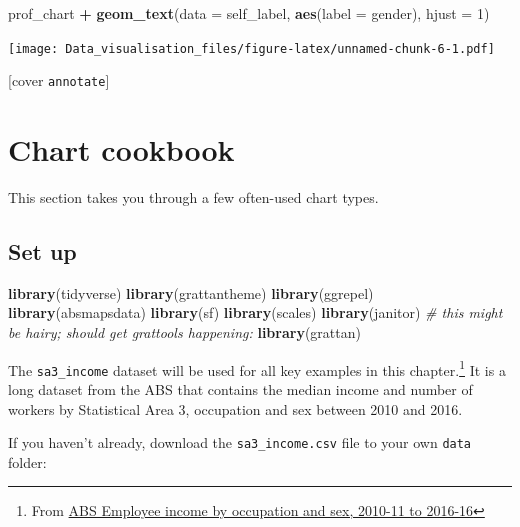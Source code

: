 \documentclass[
]{book}
\newenvironment{Shaded}{\begin{snugshade}}{\end{snugshade}}
\newcommand{\CommentTok}[1]{\textcolor[rgb]{0.56,0.35,0.01}{\textit{#1}}}
\newcommand{\DataTypeTok}[1]{\textcolor[rgb]{0.13,0.29,0.53}{#1}}
\newcommand{\DecValTok}[1]{\textcolor[rgb]{0.00,0.00,0.81}{#1}}
\newcommand{\KeywordTok}[1]{\textcolor[rgb]{0.13,0.29,0.53}{\textbf{#1}}}
\newcommand{\NormalTok}[1]{#1}
\newcommand{\OperatorTok}[1]{\textcolor[rgb]{0.81,0.36,0.00}{\textbf{#1}}}
\newcommand{\StringTok}[1]{\textcolor[rgb]{0.31,0.60,0.02}{#1}}
\begin{document}
\begin{Shaded}
\begin{Highlighting}[]
\NormalTok{prof\_chart }\OperatorTok{+}
\StringTok{  }\KeywordTok{geom\_text}\NormalTok{(}\DataTypeTok{data =}\NormalTok{ self\_label,}
            \KeywordTok{aes}\NormalTok{(}\DataTypeTok{label =}\NormalTok{ gender), }
            \DataTypeTok{hjust =} \DecValTok{1}\NormalTok{)}
\end{Highlighting}
\end{Shaded}

\texttt{[image: Data\_visualisation\_files/figure-latex/unnamed-chunk-6-1.pdf]}

{[}cover \texttt{annotate}{]}

\hypertarget{chart-cookbook}{%
\chapter{Chart cookbook}\label{chart-cookbook}}

This section takes you through a few often-used chart types.

\hypertarget{set-up-1}{%
\section{Set up}\label{set-up-1}}

\begin{Shaded}
\begin{Highlighting}[]
\KeywordTok{library}\NormalTok{(tidyverse)}
\KeywordTok{library}\NormalTok{(grattantheme)}
\KeywordTok{library}\NormalTok{(ggrepel)}
\KeywordTok{library}\NormalTok{(absmapsdata)}
\KeywordTok{library}\NormalTok{(sf)}
\KeywordTok{library}\NormalTok{(scales)}
\KeywordTok{library}\NormalTok{(janitor)}
\CommentTok{\# this might be hairy; should get \textasciigrave{}grattools\textasciigrave{} happening:}
\KeywordTok{library}\NormalTok{(grattan)}
\end{Highlighting}
\end{Shaded}

The \texttt{sa3\_income} dataset will be used for all key examples in this chapter.\footnote{From \href{https://www.abs.gov.au/AUSSTATS/abs@.nsf/DetailsPage/6524.0.55.0022011-2016?OpenDocument}{ABS Employee income by occupation and sex, 2010-11 to 2016-16}} It is a long dataset from the ABS that contains the median income and number of workers by Statistical Area 3, occupation and sex between 2010 and 2016.

If you haven't already, download the \texttt{sa3\_income.csv} file to your own \texttt{data} folder:
\end{document}
